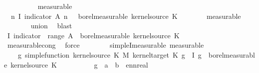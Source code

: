 \begin{isabellebody}
\ \ \ \ \ \ \ \ \isamarkupfalse%
\ measurable\isanewline
\ \ \ \ \isamarkupfalse%
\ \isamarkupfalse%
\ {\isachardoublequoteopen}{\isacharparenleft}{\kern0pt}{\isasymlambda}{\isasymomega}\ {\isasymSum}n{\isachardot}{\kern0pt}\ I\ {\isacharparenleft}{\kern0pt}indicator\ {\isacharparenleft}{\kern0pt}A\ n{\isacharparenright}{\kern0pt}{\isacharparenright}{\kern0pt}\ {\isasymomega}\ {\isasymin}\ borel{\isacharunderscore}{\kern0pt}measurable\ {\isacharparenleft}{\kern0pt}kernel{\isacharunderscore}{\kern0pt}source\ K{\isacharparenright}{\kern0pt}{\isachardoublequoteclose}\isanewline
\ \ \ \ \ \ \isamarkupfalse%
\ measurable\isanewline
\ \ \ \ \ \ \isamarkupfalse%
\ union\ \isamarkupfalse%
\ blast\isanewline
\ \ \ \ \isamarkupfalse%
\ \isamarkupfalse%
\ {\isachardoublequoteopen}I\ {\isacharparenleft}{\kern0pt}indicator\ {\isacharparenleft}{\kern0pt}{\isasymUnion}\ {\isacharparenleft}{\kern0pt}range\ A{\isacharparenright}{\kern0pt}{\isacharparenright}{\kern0pt}{\isacharparenright}{\kern0pt}\ {\isasymin}\ borel{\isacharunderscore}{\kern0pt}measurable\ {\isacharparenleft}{\kern0pt}kernel{\isacharunderscore}{\kern0pt}source\ K{\isacharparenright}{\kern0pt}{\isachardoublequoteclose}\isanewline
\ \ \ \ \ \ \isamarkupfalse%
\ measurable{\isacharunderscore}{\kern0pt}cong\ \isamarkupfalse%
\ force\isanewline
\ \ \isamarkupfalse%
\isanewline
\ \ \isamarkupfalse%
\ \isamarkupfalse%
\ simple{\isacharunderscore}{\kern0pt}I{\isacharunderscore}{\kern0pt}measurable\ {\isacharbrackleft}{\kern0pt}measurable{\isacharbrackright}{\kern0pt}{\isacharcolon}{\kern0pt}\isanewline
\ \ \ \ {\isachardoublequoteopen}{\isasymAnd}g{\isachardot}{\kern0pt}\ simple{\isacharunderscore}{\kern0pt}function\ {\isacharparenleft}{\kern0pt}kernel{\isacharunderscore}{\kern0pt}source\ K\ {\isasymOtimes}\isactrlsub M\ kernel{\isacharunderscore}{\kern0pt}target\ K{\isacharparenright}{\kern0pt}\ g\ {\isasymLongrightarrow}\ I\ g\ {\isasymin}\ borel{\isacharunderscore}{\kern0pt}measurable\ {\isacharparenleft}{\kern0pt}kernel{\isacharunderscore}{\kern0pt}source\ K{\isacharparenright}{\kern0pt}{\isachardoublequoteclose}\isanewline
\ \ \isamarkupfalse%
\ {\isacharminus}{\kern0pt}\isanewline
\ \ \ \ \isamarkupfalse%
\ g\ {\isacharcolon}{\kern0pt}{\isacharcolon}{\kern0pt}\ {\isachardoublequoteopen}{\isacharprime}{\kern0pt}a\ {\isasymtimes}\ {\isacharprime}{\kern0pt}b\ {\isasymRightarrow}\ ennreal{\isachardoublequoteclose}\isanewline

\end{isabellebody}
